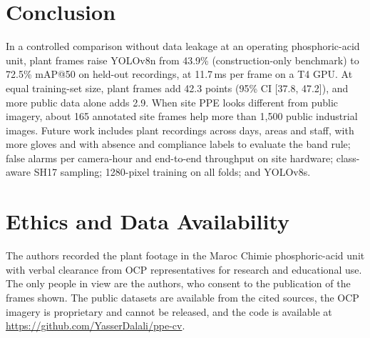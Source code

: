 \section{Conclusion}\label{sec:conclusion}

In a controlled comparison without data leakage at an operating phosphoric-acid unit, plant frames raise YOLOv8n from 43.9\% (construction-only benchmark) to 72.5\% mAP@50 on held-out recordings, at 11.7\,ms per frame on a T4 GPU. At equal training-set size, plant frames add 42.3 points (95\% CI [37.8, 47.2]), and more public data alone adds 2.9. When site PPE looks different from public imagery, about 165 annotated site frames help more than 1{,}500 public industrial images. Future work includes plant recordings across days, areas and staff, with more gloves and with absence and compliance labels to evaluate the band rule; false alarms per camera-hour and end-to-end throughput on site hardware; class-aware SH17 sampling; 1280-pixel training on all folds; and YOLOv8s.

\section*{Ethics and Data Availability}
The authors recorded the plant footage in the Maroc Chimie phosphoric-acid unit with verbal clearance from OCP representatives for research and educational use. The only people in view are the authors, who consent to the publication of the frames shown. The public datasets are available from the cited sources, the OCP imagery is proprietary and cannot be released, and the code is available at \url{https://github.com/YasserDalali/ppe-cv}.
